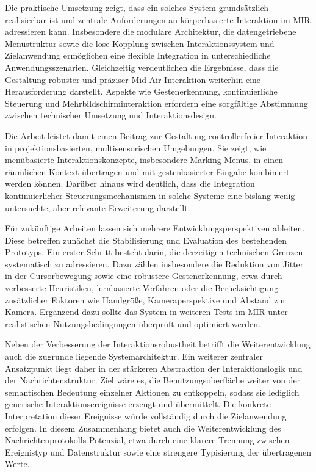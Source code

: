 Die praktische Umsetzung zeigt, dass ein solches System grund\-sätzlich realisierbar ist und zentrale Anforderungen an körper\-basierte Interaktion im MIR adressieren kann. Insbesondere die modulare Architektur, die datengetriebene Menüstruktur sowie die lose Kopplung zwischen Interaktionssystem und Zielanwendung ermög\-lichen eine flexible Integration in unterschiedliche Anwendungsszenarien. Gleichzeitig verdeutlichen die Ergebnisse, dass die Gestaltung robuster und präziser Mid-Air-Interaktion weiterhin eine Herausforderung darstellt. Aspekte wie Gestenerkennung, kontinuierliche Steuerung und Mehrbildschirminteraktion erfordern eine sorgfältige Abstimmung zwischen technischer Umsetzung und Interaktionsdesign.

Die Arbeit leistet damit einen Beitrag zur Gestaltung controllerfreier Interaktion in projektionsbasierten, multisensorischen Umgebungen. Sie zeigt, wie menübasierte Interaktionskonzepte, insbesondere Marking-Menus, in einen räumlichen Kontext übertragen und mit gestenbasierter Eingabe kombiniert werden können. Darüber hinaus wird deutlich, dass die Integration kontinuierlicher Steuerungsmechanismen in solche Systeme eine bislang wenig untersuchte, aber relevante Erweiterung darstellt.

Für zukünftige Arbeiten lassen sich mehrere Entwicklungsperspektiven ableiten. Diese betreffen zunächst die Stabilisierung und Evaluation des bestehenden Prototyps. Ein erster Schritt besteht darin, die derzeitigen technischen Grenzen systematisch zu adressieren. Dazu zählen insbesondere die Reduktion von Jitter in der Cursorbewegung sowie eine robustere Gestenerkennung, etwa durch verbesserte Heuristiken, lernbasierte Verfahren oder die Berücksichtigung zusätzlicher Faktoren wie Handgröße, Kameraperspektive und Abstand zur Kamera. Ergänzend dazu sollte das System in weiteren Tests im MIR unter realistischen Nutzungsbedingungen überprüft und optimiert werden.

Neben der Verbesserung der Interaktionsrobustheit betrifft die Weiterentwicklung auch die zugrunde liegende Systemarchitektur. Ein weiterer zentraler Ansatzpunkt liegt daher in der stärkeren Abstraktion der Interaktionslogik und der Nachrichtenstruktur. Ziel wäre es, die Benutzungsoberfläche weiter von der semantischen Bedeutung einzelner Aktionen zu entkoppeln, sodass sie lediglich generische Interaktionsereignisse erzeugt und übermittelt. Die konkrete Interpretation dieser Ereignisse würde vollständig durch die Zielanwendung erfolgen. In diesem Zusammenhang bietet auch die Weiterentwicklung des Nachrichtenprotokolls Potenzial, etwa durch eine klarere Trennung zwischen Ereignistyp und Datenstruktur sowie eine strengere Typisierung der übertragenen Werte.


